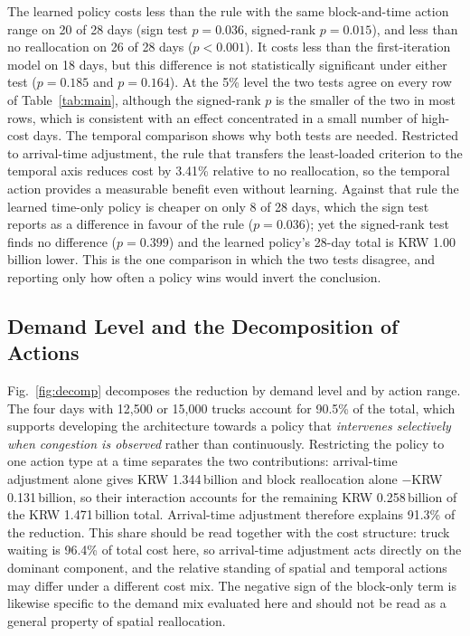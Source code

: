 \documentclass[a4paper]{llncs}
\begin{document}
The learned policy costs less than the rule with the same
block-and-time action range on 20 of 28 days (sign test $p=0.036$,
signed-rank $p=0.015$), and less than no reallocation on 26 of 28 days
($p<0.001$). It costs less than the first-iteration model on 18 days,
but this difference is not statistically significant under either test
($p=0.185$ and $p=0.164$). At the 5\% level the two tests agree on every
row of Table~\ref{tab:main}, although the signed-rank $p$ is the smaller
of the two in most rows, which is consistent with an effect concentrated
in a small number of high-cost days.
The temporal comparison shows why both tests are needed.
Restricted to arrival-time adjustment, the rule that transfers the
least-loaded criterion to the temporal axis reduces cost by 3.41\%
relative to no reallocation, so the temporal action provides a
measurable benefit even without learning. Against that rule the learned
time-only policy is cheaper on only 8 of 28 days, which the sign test
reports as a difference in favour of the rule ($p=0.036$); yet the
signed-rank test finds no difference ($p=0.399$) and the learned
policy's 28-day total is KRW 1.00\,billion lower. This is the one comparison
in which the two tests disagree, and reporting only how often a policy
wins would invert the conclusion.

\subsection{Demand Level and the Decomposition of Actions}
\label{sec:exp-decomp}
Fig.~\ref{fig:decomp} decomposes the reduction by demand level and by
action range. The four days with 12{,}500 or 15{,}000 trucks account for
90.5\% of the total, which supports developing the architecture towards
a policy that \emph{intervenes selectively when congestion is observed}
rather than continuously. Restricting the policy to one action type at a
time separates the two contributions: arrival-time adjustment alone
gives KRW 1.344\,billion and block reallocation alone $-$KRW 0.131\,billion, so
their interaction accounts for the remaining KRW 0.258\,billion of the
KRW 1.471\,billion total. Arrival-time adjustment therefore explains 91.3\%
of the reduction. This share should be read together with the cost
structure: truck waiting is 96.4\% of total cost here, so arrival-time
adjustment acts directly on the dominant component, and the relative
standing of spatial and temporal actions may differ under a different
cost mix. The negative sign of the block-only term is likewise specific
to the demand mix evaluated here and should not be read as a general
property of spatial reallocation.
\end{document}
